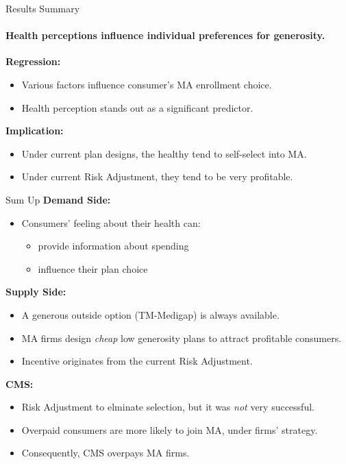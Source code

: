 \begin{frame}{Results Summary}
    \framesubtitle{\textcolor{structure}{Health perceptions influence individual preferences for generosity.}}
    \textbf{Regression:}
        \begin{itemize}
            \item Various factors influence consumer's MA enrollment choice.
            \item Health perception stands out as a significant predictor.
        \end{itemize}
        \vfill
        \pause
        \textbf{Implication:}
        \begin{itemize}
            \item Under current plan designs, the healthy tend to self-select into MA.
            \item Under current Risk Adjustment, they tend to be very profitable.
        \end{itemize}
\end{frame}

\begin{frame}{Sum Up}
    \textbf{Demand Side:}
    \begin{itemize}
        \item Consumers' feeling about their health can:
        \begin{itemize}
            \item provide information about spending
            \item influence their plan choice
        \end{itemize}
    \end{itemize}
    \vfill
    \pause
    \textbf{Supply Side:}
    \begin{itemize}
        \item A generous outside option (TM-Medigap) is always available.
        \item MA firms design \textit{cheap} low generosity plans to attract profitable consumers.
        \item Incentive originates from the current Risk Adjustment.
    \end{itemize}
    \pause
    \vfill
    \textbf{CMS:}
    \begin{itemize}
        \item Risk Adjustment to elminate selection, but it was \textit{not} very successful.
        \item Overpaid consumers are more likely to join MA, under firms' strategy.
        \item Consequently, CMS overpays MA firms.
    \end{itemize}
\end{frame}


